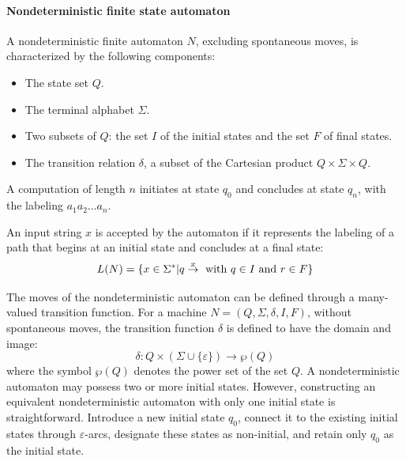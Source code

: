 \paragraph*{Nondeterministic finite state automaton}
A nondeterministic finite automaton $N$, excluding spontaneous moves, is characterized by the following components:
\begin{itemize}
    \item The state set $Q$. 
    \item The terminal alphabet $\Sigma$. 
    \item Two subsets of $Q$: the set $I$ of the initial states and the set $F$ of final states.
    \item The transition relation $\delta$, a subset of the Cartesian product $Q\times\Sigma\times Q$.     
\end{itemize}
A computation of length $n$ initiates at state $q_0$ and concludes at state $q_n$, with the labeling $a_1a_2\dots a_n$. 
\begin{definition}
    An input string $x$ is accepted by the automaton if it represents the labeling of a path that begins at an initial state and concludes at a final state:
    \[L(N)=\{x \in \Sigma^{*}|q \overset{x}{\rightarrow} \textnormal{ with } q \in I \textnormal{ and } r \in F\}\]
\end{definition}
The moves of the nondeterministic automaton can be defined through a many-valued transition function.  
For a machine $N=(Q,\Sigma,\delta,I,F)$, without spontaneous moves, the transition function $\delta$ is defined to have the domain and image:
\[\delta:Q\times\left(\Sigma\cup\{\varepsilon\}\right)\rightarrow \wp(Q)\]
where the symbol $\wp(Q)$ denotes the power set of the set $Q$.
A nondeterministic automaton may possess two or more initial states.
However, constructing an equivalent nondeterministic automaton with only one initial state is straightforward.
Introduce a new initial state $q_0$, connect it to the existing initial states through $\varepsilon$-arcs, designate these states as non-initial, and retain only $q_0$ as the initial state.

